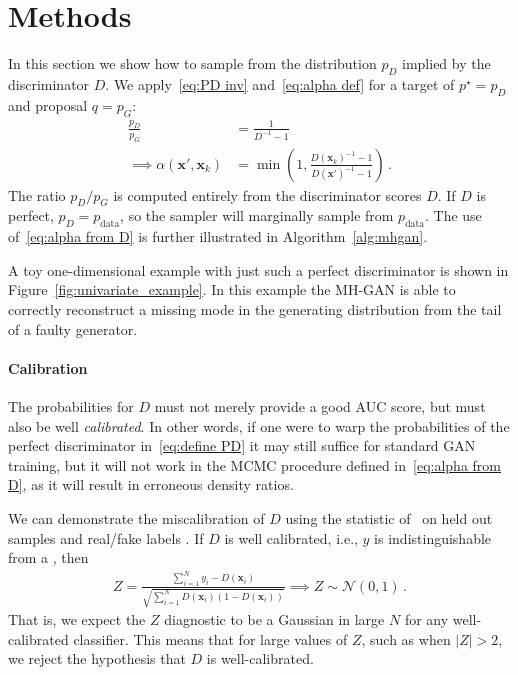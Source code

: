 \documentclass{article}
\renewcommand{\vec}[1]{{\boldsymbol{\mathbf{#1}}}} %
\newcommand{\sample}{\sim}
\newcommand{\norm}{\mathcal{N}}
\newcommand{\bern}{\textrm{Bern}}
\newcommand{\target}{{p^\star}}
\newcommand{\prop}{q}
\newcommand{\PG}{{p_G}}
\newcommand{\PD}{{p_D}}
\newcommand{\PR}{{p_{\textrm{data}}}}
\newcommand{\accept}{\alpha}
\begin{document}


\section{Methods}
\label{sec:Methods}

In this section we show how to sample from the distribution $\PD$ implied by the discriminator $D$.
We apply~\eqref{eq:PD inv} and~\eqref{eq:alpha def} for a target of $\target=\PD$ and proposal $\prop=\PG$:
\begin{align}
  \frac{\PD}{\PG} &= \frac{1}{D^{-1} - 1} \\
  \implies
  \accept(\vec x', \vec x_k) &= \min\left(1, \frac{D(\vec x_k)^{-1} - 1}{D(\vec x')^{-1} - 1}\right)\,. \label{eq:alpha from D}
\end{align}
The ratio $\PD/\PG$ is computed entirely from the discriminator scores $D$.
If $D$ is perfect, $\PD = \PR$, so the sampler will marginally sample from $\PR$.
The use of~\eqref{eq:alpha from D} is further illustrated in Algorithm~\ref{alg:mhgan}.

A toy one-dimensional example with just such a perfect discriminator is shown in Figure~\ref{fig:univariate_example}.
In this example the MH-GAN is able to correctly reconstruct a missing mode in the generating distribution from the tail of a faulty generator.

\paragraph{Calibration}
The probabilities for $D$ must not merely provide a good AUC score, but must also be well \emph{calibrated}.
In other words, if one were to warp the probabilities of the perfect discriminator in~\eqref{eq:define PD} it may still suffice for standard GAN training, but it will not work in the MCMC procedure defined in~\eqref{eq:alpha from D}, as it will result in erroneous density ratios.

We can demonstrate the miscalibration of $D$ using the statistic of~\citet{Dawid1997} on held out samples \smash{$\vec x_{1:N}$} and real/fake labels .
If $D$ is well calibrated, i.e., $y$ is indistinguishable from a \smash{$y \sample \bern(D(\vec x))$}, then
\begin{align}
  Z = \frac{\sum_{i=1}^N y_i - D(\vec x_i)}{\sqrt{\sum_{i=1}^N D(\vec x_i) (1 - D(\vec x_i))}} \!\!\implies\!\! Z \sample \norm(0,1)\,. \label{eq:calib score}
\end{align}
That is, we expect the $Z$ diagnostic to be a Gaussian in large $N$ for any well-calibrated classifier.
This means that for large values of $Z$, such as when $|Z| > 2$, we reject the hypothesis that $D$ is well-calibrated.
\end{document}
